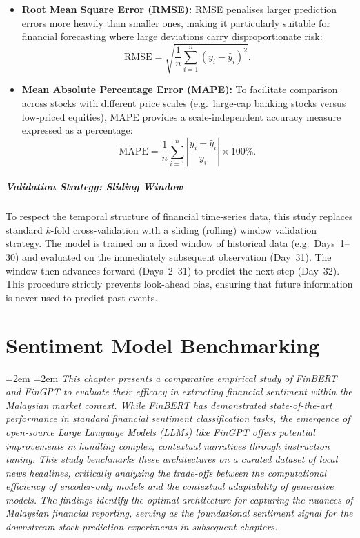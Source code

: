 \documentclass[singlespace]{ucetd}
\newcommand{\chapterabstract}[1]{%
  \par\vspace{1em}
  \begingroup
  \leftskip=2em
  \rightskip=2em
  \noindent\itshape
  #1
  \par
  \endgroup
  \vspace{1.5em}
}
\begin{document}
\begin{itemize}
    \item \textbf{Root Mean Square Error (RMSE):}  
    RMSE penalises larger prediction errors more heavily than smaller ones, making it particularly suitable for financial forecasting where large deviations carry disproportionate risk:
    \[
        \text{RMSE} =
        \sqrt{
        \frac{1}{n}
        \sum_{i=1}^{n}
        \left( y_i - \hat{y}_i \right)^2
        }.
    \]

    \item \textbf{Mean Absolute Percentage Error (MAPE):}  
    To facilitate comparison across stocks with different price scales (e.g.\ large-cap banking stocks versus low-priced equities), MAPE provides a scale-independent accuracy measure expressed as a percentage:
    \[
        \text{MAPE} =
        \frac{1}{n}
        \sum_{i=1}^{n}
        \left|
        \frac{y_i - \hat{y}_i}{y_i}
        \right|
        \times 100\%.
    \]
\end{itemize}

\paragraph{Validation Strategy: Sliding Window}

To respect the temporal structure of financial time-series data, this study replaces standard $k$-fold cross-validation with a sliding (rolling) window validation strategy. The model is trained on a fixed window of historical data (e.g.\ Days~1--30) and evaluated on the immediately subsequent observation (Day~31). The window then advances forward (Days~2--31) to predict the next step (Day~32). This procedure strictly prevents look-ahead bias, ensuring that future information is never used to predict past events.


\chapter{Sentiment Model Benchmarking}

\chapterabstract{This chapter presents a comparative empirical study of FinBERT and FinGPT to evaluate their efficacy in extracting financial sentiment within the Malaysian market context. While FinBERT has demonstrated state-of-the-art performance in standard financial sentiment classification tasks, the emergence of open-source Large Language Models (LLMs) like FinGPT offers potential improvements in handling complex, contextual narratives through instruction tuning. This study benchmarks these architectures on a curated dataset of local news headlines, critically analyzing the trade-offs between the computational efficiency of encoder-only models and the contextual adaptability of generative models. The findings identify the optimal architecture for capturing the nuances of Malaysian financial reporting, serving as the foundational sentiment signal for the downstream stock prediction experiments in subsequent chapters.}
\end{document}
